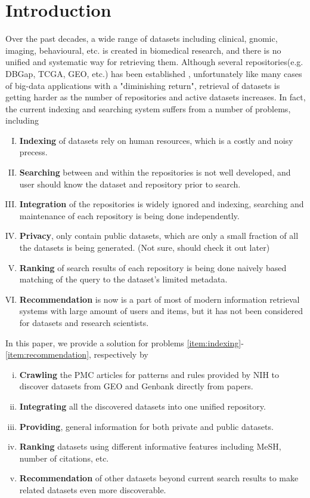 \documentclass[twoside,11pt]{article}
\begin{document}
\section{Introduction} \label{sec:introduction}
Over the past decades, a wide range of datasets including clinical, gnomic, imaging, behavioural, etc. is created in biomedical research, and there is no unified and systematic way for retrieving them. Although several repositories(e.g. DBGap, TCGA, GEO, etc.) has been established \cite{nih-repo}, unfortunately like many cases of big-data applications with a "diminishing return", retrieval of datasets is getting harder as the number of repositories and active datasets increases. In fact, the current indexing and searching system suffers from a number of problems, including
\begin{enumerate}[(I)]
	\item {\bf Indexing} of datasets rely on human resources, which is a costly and noisy precess. \label{item:indexing}
	\item {\bf Searching} between and within the repositories is not well developed, and user should know the dataset and repository prior to search.
	\item {\bf Integration} of the repositories is widely ignored and indexing, searching and maintenance of each repository is being done independently.
	\item {\bf Privacy}, only contain public datasets, which are only a small fraction of all the datasets is being generated. (Not sure, should check it out later)
	\item {\bf Ranking} of search results of each repository is being done naively based matching of the query to the dataset's limited metadata.
	\item {\bf Recommendation} is now is a part of most of modern information retrieval systems with large amount of users and items, but it has not been considered for datasets and research scientists. \label{item:recommendation}
\end{enumerate}

In this paper, we provide a solution for problems \eqref{item:indexing}-\eqref{item:recommendation}, respectively by
\begin{enumerate}[(i)]
	\item {\bf Crawling} the PMC articles for patterns and rules provided by NIH to discover datasets from GEO \cite{geo-citation-rule} and Genbank \cite{genbank-citation-rule} directly from papers. \label{item:crawiling}
	\item {\bf Integrating} all the discovered datasets into one unified repository. \label{item:integrating}
	\item {\bf Providing}, general information for both private and public datasets.
	\item {\bf Ranking} datasets using different informative features including MeSH, number of citations, etc.
	\item {\bf Recommendation} of other datasets beyond current search results to make related datasets even more discoverable. \label{item:recommendation-sol}
\end{enumerate}
\end{document}
